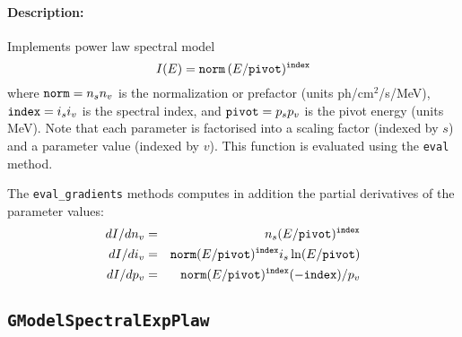 \documentclass{article}[12pt,a4]
\begin{document}
\paragraph{Description:}
Implements power law spectral model
\begin{equation}
I(E) = {\tt norm} \, (E/{\tt pivot})^{{\tt index}}
\end{equation}
where
${\tt norm}=n_s n_v$ is the normalization or prefactor (units ph/cm$^2$/s/MeV),
${\tt index}=i_s i_v$ is the spectral index, and
${\tt pivot}=p_s p_v$ is the pivot energy (units MeV).
Note that each parameter is factorised into a scaling factor (indexed by $s$) and a 
parameter value (indexed by $v$).
This function is evaluated using the {\tt eval} method.

The {\tt eval\_gradients} methods computes in addition the partial derivatives of 
the parameter values:
\begin{eqnarray}
dI/dn_v &= & n_s (E/{\tt pivot})^{{\tt index}} \\
dI/di_v & = & {\tt norm} (E/{\tt pivot})^{{\tt index}} i_s \ln(E/{\tt pivot}) \\
dI/dp_v & = & {\tt norm} (E/{\tt pivot})^{{\tt index}} (-{\tt index}) / p_v
\end{eqnarray}


\newpage
\subsection{{\tt GModelSpectralExpPlaw}}
\end{document}
